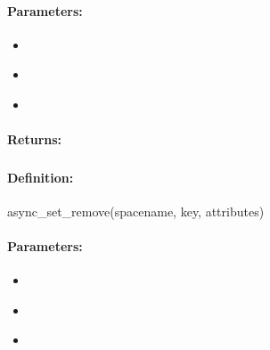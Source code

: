 \paragraph{Parameters:}
\begin{itemize}[noitemsep]
\item {}\\

\item {}\\

\item {}\\

\end{itemize}

\paragraph{Returns:}


\pagebreak
\subsubsection{}
\label{api:ruby:async_set_remove}


\paragraph{Definition:}
\begin{rubycode}
async_set_remove(spacename, key, attributes)
\end{rubycode}

\paragraph{Parameters:}
\begin{itemize}[noitemsep]
\item {}\\

\item {}\\

\item {}\\

\end{itemize}


